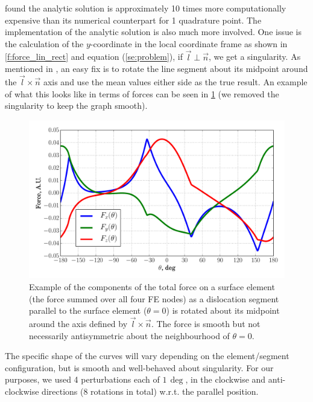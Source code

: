 \documentclass[11pt]{iopart}
\begin{document}
\citet{Queyreau} found the analytic solution is approximately 10 times more computationally expensive than its numerical counterpart for 1 quadrature point. The implementation of the analytic solution is also much more involved. One issue is the calculation of the $y$-coordinate in the local coordinate frame as shown in \cref{f:force_lin_rect} and equation (\ref{se:problem}), if $\vec{l} \perp \vec{n}$, we get a singularity. As mentioned in \cite{Queyreau}, an easy fix is to rotate the line segment about its midpoint around the $\vec{l} \times \vec{n}$ axis and use the mean values either side as the true result. An example of what this looks like in terms of forces can be seen in \cref{f:rotate} (we removed the singularity to keep the graph smooth).
%
\begin{figure}[htb]
    \centering
    \includegraphics[width=0.8\linewidth]{ftot_rotation_lin_rect.pdf}
    \caption{Example of the components of the total force on a surface element (the force summed over all four FE nodes) as a dislocation segment parallel to the surface element ($\theta = 0$) is rotated about its midpoint around the axis defined by $\vec{l}\times\vec{n}$. The force is smooth but not necessarily antisymmetric about the neighbourhood of $\theta=0$.}
    \label{f:rotate}
\end{figure}

The specific shape of the curves will vary depending on the element/segment configuration, but is smooth and well-behaved about singularity. For our purposes, we used 4 perturbations each of $1\,\deg$, in the clockwise and anti-clockwise directions (8 rotations in total) w.r.t. the parallel position.
\end{document}
